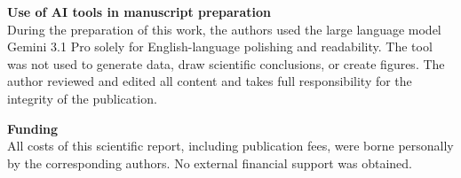 \documentclass{article}
\begin{document}
\textbf{Use of AI tools in manuscript preparation} \\
During the preparation of this work, the authors used the large language model Gemini 3.1 Pro solely for English-language polishing and readability. The tool was not used to generate data, draw scientific conclusions, or create figures. The author reviewed and edited all content and takes full responsibility for the integrity of the publication.

\textbf{Funding} \\
All costs of this scientific report, including publication fees, were borne personally by the corresponding authors. No external financial support was obtained.



\end{document}
